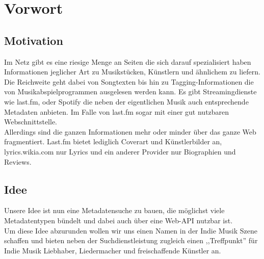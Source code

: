 \chapter{Vorwort}

\section{Motivation}

Im Netz gibt es eine riesige Menge an Seiten die sich darauf spezialisiert
haben Informationen jeglicher Art zu Musikstücken, Künstlern und ähnlichem zu
liefern.
\\
Die Reichweite geht dabei von Songtexten bis hin zu Tagging-Informationen die von
Musikabspielprogrammen ausgelesen werden kann. Es gibt Streamingdienste wie last.fm,
oder Spotify die neben der eigentlichen Musik auch entsprechende Metadaten anbieten. 
Im Falle von last.fm sogar mit einer gut nutzbaren Webschnittstelle.
\\
Allerdings sind die ganzen Informationen mehr oder minder über das ganze Web
fragmentiert. Last.fm bietet lediglich Coverart und Künstlerbilder an, 
lyrics.wikia.com nur Lyrics und ein anderer Provider nur Biographien und
Reviews.
\\
\section{Idee}
Unsere Idee ist nun eine Metadatensuche zu bauen, die möglichst viele
Metadatentypen bündelt und dabei auch über eine Web-API nutzbar ist.
\\
Um diese Idee abzurunden wollen wir uns einen Namen in der Indie Musik Szene
schaffen und bieten neben der Suchdienstleistung zugleich einen ,,Treffpunkt'' für Indie
Musik Liebhaber, Liedermacher und freischaffende Künstler an.
